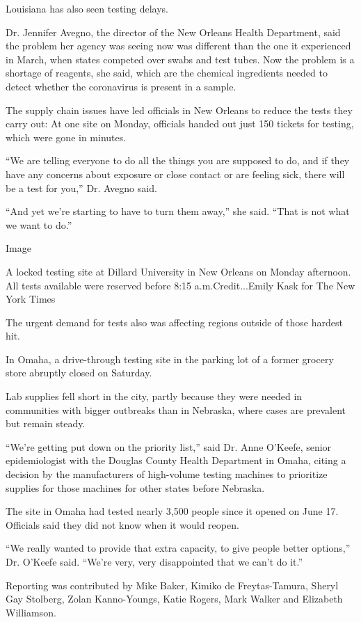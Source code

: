 Louisiana has also seen testing delays.

Dr. Jennifer Avegno, the director of the New Orleans Health Department,
said the problem her agency was seeing now was different than the one it
experienced in March, when states competed over swabs and test tubes.
Now the problem is a shortage of reagents, she said, which are the
chemical ingredients needed to detect whether the coronavirus is present
in a sample.

The supply chain issues have led officials in New Orleans to reduce the
tests they carry out: At one site on Monday, officials handed out just
150 tickets for testing, which were gone in minutes.

``We are telling everyone to do all the things you are supposed to do,
and if they have any concerns about exposure or close contact or are
feeling sick, there will be a test for you,'' Dr. Avegno said.

``And yet we're starting to have to turn them away,'' she said. ``That
is not what we want to do.''

Image

A locked testing site at Dillard University in New Orleans on Monday
afternoon. All tests available were reserved before 8:15
a.m.Credit...Emily Kask for The New York Times

The urgent demand for tests also was affecting regions outside of those
hardest hit.

In Omaha, a drive-through testing site in the parking lot of a former
grocery store abruptly closed on Saturday.

Lab supplies fell short in the city, partly because they were needed in
communities with bigger outbreaks than in Nebraska, where cases are
prevalent but remain steady.

``We're getting put down on the priority list,'' said Dr. Anne O'Keefe,
senior epidemiologist with the Douglas County Health Department in
Omaha, citing a decision by the manufacturers of high-volume testing
machines to prioritize supplies for those machines for other states
before Nebraska.

The site in Omaha had tested nearly 3,500 people since it opened on June
17. Officials said they did not know when it would reopen.

``We really wanted to provide that extra capacity, to give people better
options,'' Dr. O'Keefe said. ``We're very, very disappointed that we
can't do it.''

Reporting was contributed by Mike Baker, Kimiko de Freytas-Tamura,
Sheryl Gay Stolberg, Zolan Kanno-Youngs, Katie Rogers, Mark Walker and
Elizabeth Williamson.

